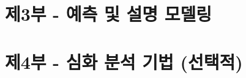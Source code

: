 \documentclass[
  letterpaper,
]{book}
\begin{document}
\chapter{}\label{section}

\chapter{}\label{section-1}

\chapter{}\label{section-2}

\part{제3부 - 예측 및 설명 모델링}

\chapter{}\label{section-3}

\chapter{}\label{section-4}

\chapter{}\label{section-5}

\chapter{}\label{section-6}

\chapter{}\label{section-7}

\part{제4부 - 심화 분석 기법 (선택적)}

\chapter{}\label{section-8}

\chapter{}\label{section-9}
\end{document}
